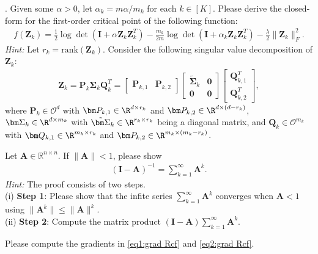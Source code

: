 \documentclass[../../book-main.tex]{subfiles}
\begin{document}
\begin{exercise}
. Given some $\alpha >0$, let $\alpha_k=m\alpha/m_k$ for each $k \in [K]$. Please derive the closed-form for the first-order critical point of the following function: 
\begin{align*}
    f(\bm Z_k) = \frac{1}{2}\log\det\left(\bm I + \alpha\bm Z_k\bm Z_k^T \right) - \frac{m_k}{2m}\log\det\left(\bm I + \alpha_k \bm Z_k\bm Z_k^T \right) - \frac{\lambda}{2}\|\bm Z_k\|_F^2. 
\end{align*}
{\em Hint:} Let $r_k=\mathrm{rank}(\bm Z_k)$. Consider the following singular value decomposition of $\bm Z_k$: 
\begin{align*}
    \bm Z_k = \bm P_k\bm \Sigma_k\bm Q_k^T = \begin{bmatrix}
        \bm P_{k,1} & \bm P_{k,2}
    \end{bmatrix} \begin{bmatrix}
        \tilde{\bm \Sigma}_{k} & \bm 0 \\
        \bm 0 & \bm 0
    \end{bmatrix} 
    \begin{bmatrix}
        \bm Q_{k,1}^T \\ \bm Q_{k,2}^T
    \end{bmatrix}, 
\end{align*}
where $\bm P_k \in \mathcal{O}^d$ with $\bm P_{k,1} \in \R^{d\times r_k}$ and  $\bm P_{k,2} \in \R^{d\times (d-r_k)}$, $\bm \Sigma_k \in \R^{d\times m_k}$ with $\tilde{\bm \Sigma}_{k} \in \R^{r_k\times r_k}$ being a diagonal matrix, and  $\bm Q_k \in \mathcal{O}^{m_k}$ with $\bm Q_{k,1} \in \R^{m_k\times r_k}$ and  $\bm P_{k,2} \in \R^{m_k \times (m_k-r_k)}$. 
\medskip 

\end{exercise}


\begin{exercise}\label{ex:neumannn} 
Let $\bm A \in \mathbb{R}^{n\times n}$. If $\|\bm A\| < 1$, please show 
\begin{align}\label{eq:neumann}
    \left( \bm I - \bm A\right)^{-1} = \sum_{k=1}^\infty \bm A^k.  
\end{align}
{\em Hint:} The proof consists of two steps. \\
(i) {\bf Step 1}: Please show that the infite series $\sum_{k=1}^\infty \bm A^k$ converges when $\bm A < 1$ using $\|\bm A^k\| \le \|\bm A\|^k$. \\
(ii) {\bf Step 2}: Compute the matrix product $(\bm I - \bm A) \sum_{k=1}^\infty \bm A^k$. 
\end{exercise}


\begin{exercise}
    Please compute the gradients in \eqref{eq1:grad Rcf} and \eqref{eq2:grad Rcf}. 
\end{exercise}
\end{document}
